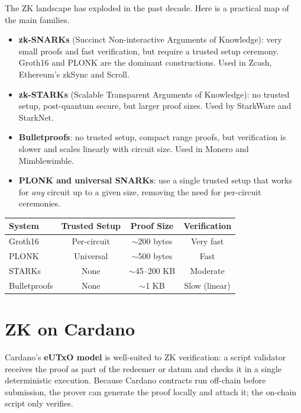 The ZK landscape has exploded in the past decade. Here is a practical map of the main families.

\begin{itemize}
  \item \textbf{zk-SNARKs} (Succinct Non-interactive Arguments of Knowledge): very small proofs and fast verification, but require a trusted setup ceremony. Groth16 and PLONK are the dominant constructions. Used in Zcash, Ethereum's zkSync and Scroll.
  \item \textbf{zk-STARKs} (Scalable Transparent Arguments of Knowledge): no trusted setup, post-quantum secure, but larger proof sizes. Used by StarkWare and StarkNet.
  \item \textbf{Bulletproofs}: no trusted setup, compact range proofs, but verification is slower and scales linearly with circuit size. Used in Monero and Mimblewimble.
  \item \textbf{PLONK and universal SNARKs}: use a single trusted setup that works for \emph{any} circuit up to a given size, removing the need for per-circuit ceremonies.
\end{itemize}

\begin{center}
\begin{tabular}{lccc}
  \hline
  \textbf{System}     & \textbf{Trusted Setup} & \textbf{Proof Size} & \textbf{Verification} \\
  \hline
  Groth16             & Per-circuit            & $\sim$200 bytes     & Very fast             \\
  PLONK               & Universal              & $\sim$500 bytes     & Fast                  \\
  STARKs              & None                   & $\sim$45--200 KB    & Moderate              \\
  Bulletproofs        & None                   & $\sim$1 KB          & Slow (linear)         \\
  \hline
\end{tabular}
\end{center}

\section{ZK on Cardano}

Cardano's \textbf{eUTxO model} is well-suited to ZK verification: a script validator receives the proof as part of the redeemer or datum and checks it in a single deterministic execution. Because Cardano contracts run off-chain before submission, the prover can generate the proof locally and attach it; the on-chain script only verifies.


